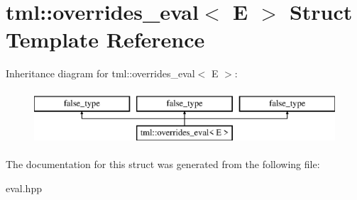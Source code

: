 \hypertarget{structtml_1_1overrides__eval}{\section{tml\+:\+:overrides\+\_\+eval$<$ E $>$ Struct Template Reference}
\label{structtml_1_1overrides__eval}
}
Inheritance diagram for tml\+:\+:overrides\+\_\+eval$<$ E $>$\+:\begin{figure}[H]
\begin{center}
\leavevmode
\includegraphics[height=2.000000cm]{structtml_1_1overrides__eval}
\end{center}
\end{figure}


The documentation for this struct was generated from the following file\+:\begin{DoxyCompactItemize}
\item 
eval.\+hpp\end{DoxyCompactItemize}
